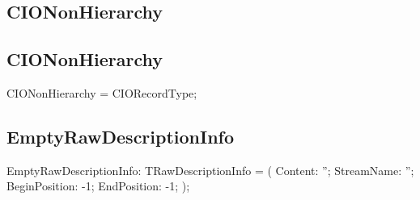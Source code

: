\documentclass{report}
\newif\ifpdf
\begin{document}
\subsection*{\large{\textbf{CIONonHierarchy}}\normalsize\hspace{1ex}\hrulefill}
\else
\subsection*{CIONonHierarchy}
\fi
\label{PasDoc_Items-CIONonHierarchy}
\begin{list}{}{
\setlength{\itemindent}{0cm}
\setlength{\listparindent}{0cm}
\setlength{\leftmargin}{\evensidemargin}
\addtolength{\leftmargin}{\tmplength}
\settowidth{\labelsep}{X}
\addtolength{\leftmargin}{\labelsep}
\setlength{\labelwidth}{\tmplength}
}
\item[\textbf{Declaration}\hfill]
\ifpdf
\begin{flushleft}
\fi
\begin{ttfamily}
CIONonHierarchy = CIORecordType;\end{ttfamily}

\ifpdf
\end{flushleft}
\fi

\end{list}
\ifpdf
\subsection*{\large{\textbf{EmptyRawDescriptionInfo}}\normalsize\hspace{1ex}\hrulefill}
\else
\subsection*{EmptyRawDescriptionInfo}
\fi
\label{PasDoc_Items-EmptyRawDescriptionInfo}
\begin{list}{}{
\setlength{\itemindent}{0cm}
\setlength{\listparindent}{0cm}
\setlength{\leftmargin}{\evensidemargin}
\addtolength{\leftmargin}{\tmplength}
\settowidth{\labelsep}{X}
\addtolength{\leftmargin}{\labelsep}
\setlength{\labelwidth}{\tmplength}
}
\item[\textbf{Declaration}\hfill]
\ifpdf
\begin{flushleft}
\fi
\begin{ttfamily}
EmptyRawDescriptionInfo: TRawDescriptionInfo =
  ( Content: ''; StreamName: ''; BeginPosition: -1; EndPosition: -1; );\end{ttfamily}

\ifpdf
\end{flushleft}
\fi

\end{list}
\end{document}
